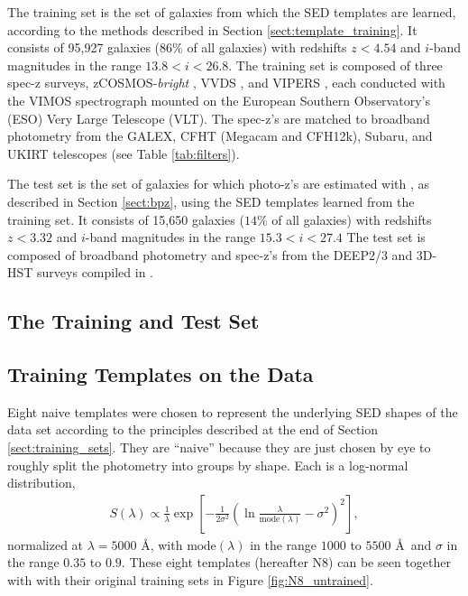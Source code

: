 
\label{sect:application}


The training set is the set of galaxies from which the SED templates are learned, according to the methods described in Section \ref{sect:template_training}.
It consists of 95,927 galaxies ($86\%$ of all galaxies) with redshifts $z < 4.54$ and $i$-band magnitudes in the range $13.8 < i < 26.8$.
The training set is composed of three spec-z surveys, zCOSMOS-\textit{bright} \citep{Lilly2009a}, VVDS \citep{LeFevre2013b}, and VIPERS \citep{Scodeggio2018a}, each conducted with the VIMOS spectrograph mounted on the European Southern Observatory's (ESO) Very Large Telescope (VLT).
The spec-z's are matched to broadband photometry from the GALEX, CFHT (Megacam and CFH12k), Subaru, and UKIRT telescopes (see Table \ref{tab:filters}).

The test set is the set of galaxies for which photo-z's are estimated with \bpz, as described in Section \ref{sect:bpz}, using the SED templates learned from the training set. 
It consists of 15,650 galaxies ($14\%$ of all galaxies) with redshifts $z < 3.32$ and $i$-band magnitudes in the range $15.3 < i < 27.4$
The test set is composed of broadband photometry and spec-z's from the DEEP2/3 and 3D-HST surveys compiled in \citet{Zhou2019a}.



\subsection{The Training and Test Set}





\subsection{Training Templates on the Data}

Eight naive templates were chosen to represent the underlying SED shapes of the data set according to the principles described at the end of Section \ref{sect:training_sets}. 
They are ``naive'' because they are just chosen by eye to roughly split the photometry into groups by shape. 
Each is a log-normal distribution,
\begin{align}
    S(\lambda) \propto \frac{1}{\lambda} \exp{\left[ -\frac{1}{2\sigma^2} \left( \ln{\frac{\lambda}{\text{mode}(\lambda)}}-\sigma^2 \right)^2 \right]},
\end{align}
normalized at $\lambda = 5000$ \AA, with $\text{mode}(\lambda)$ in the range $1000$ to $5500$ \AA\  and $\sigma$ in the range $0.35$ to $0.9$. 
These eight templates (hereafter N8) can be seen together with with their original training sets in Figure \ref{fig:N8_untrained}.

